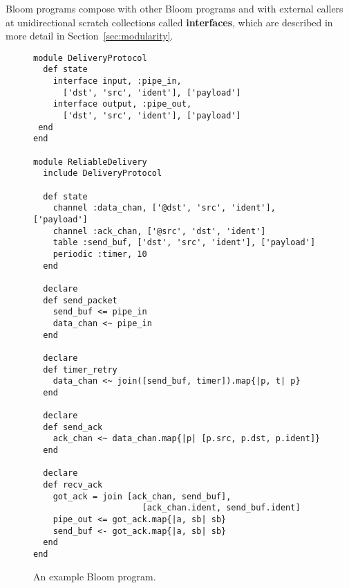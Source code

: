 Bloom programs compose with other Bloom programs and with external callers at
unidirectional scratch collections called \textbf{interfaces}, which are described in more
detail in Section~\ref{sec:modularity}.

\begin{figure}[t]
\begin{scriptsize}
\begin{lstlisting}
module DeliveryProtocol
  def state
    interface input, :pipe_in,
      ['dst', 'src', 'ident'], ['payload']
    interface output, :pipe_out,
      ['dst', 'src', 'ident'], ['payload']
 end
end

module ReliableDelivery
  include DeliveryProtocol

  def state
    channel :data_chan, ['@dst', 'src', 'ident'], ['payload']
    channel :ack_chan, ['@src', 'dst', 'ident']
    table :send_buf, ['dst', 'src', 'ident'], ['payload']
    periodic :timer, 10
  end

  declare
  def send_packet
    send_buf <= pipe_in
    data_chan <~ pipe_in
  end

  declare
  def timer_retry
    data_chan <~ join([send_buf, timer]).map{|p, t| p}
  end

  declare
  def send_ack
    ack_chan <~ data_chan.map{|p| [p.src, p.dst, p.ident]}
  end

  declare
  def recv_ack
    got_ack = join [ack_chan, send_buf],
                      [ack_chan.ident, send_buf.ident]
    pipe_out <= got_ack.map{|a, sb| sb}
    send_buf <- got_ack.map{|a, sb| sb}
  end
end
\end{lstlisting}
\centering
\vspace{-10pt}
\caption{An example Bloom program.}
\label{fig:bloom-example}
\end{scriptsize}
\vspace{-2pt}
\end{figure}

